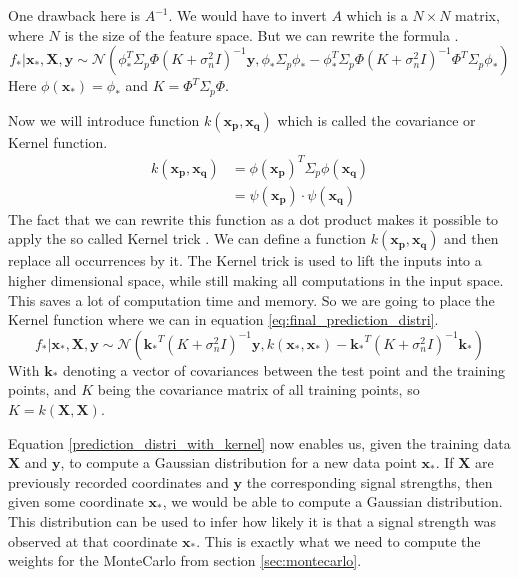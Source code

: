 One drawback here is $A^{-1}$. We would have to invert $A$ which is a $N\times N$ matrix, where $N$ is the size of the feature space. But we can rewrite the formula \citep[p.\ 12]{Rasmussen:2005:GPM:1162254}. 
\begin{equation}\label{eq:final_prediction_distri}
f_*|\mathbf{x_*},\mathbf{X}, \mathbf{y} \sim \mathcal{N}(\phi_*^T\Sigma_p\Phi(K+\sigma_n^2I)^{-1}\mathbf{y}, \phi_*\Sigma_p\phi_*-\phi_*^T\Sigma_p\Phi(K+\sigma_n^2I)^{-1}\Phi^T\Sigma_p\phi_*)
\end{equation}
Here $\phi(\mathbf{x_*}) = \phi_*$ and $K = \Phi^T\Sigma_p\Phi$.

Now we will introduce function $k(\mathbf{x_p}, \mathbf{x_q})$ which is called the covariance or \gls{Kernel} function. 
\begin{equation}\label{kernel}
\begin{aligned}
k(\mathbf{x_p}, \mathbf{x_q}) &= \phi(\mathbf{x_p})^T\Sigma_p\phi(\mathbf{x_q})\\
&= \psi(\mathbf{x_p}) \cdot \psi(\mathbf{x_q})
\end{aligned}
\end{equation}
The fact that we can rewrite this function as a dot product makes it possible to apply the so called \gls{Kernel} trick \citep[p.\ 12]{Rasmussen:2005:GPM:1162254}. We can define a function $k(\mathbf{x_p},\mathbf{x_q})$ and then replace all occurrences by it. The \gls{Kernel} trick is used to lift the inputs into a higher dimensional space, while still making all computations in the input space. This saves a lot of computation time and memory. So we are going to place the \gls{Kernel} function where we can in equation \ref{eq:final_prediction_distri}.
\begin{equation}\label{prediction_distri_with_kernel}
f_*|\mathbf{x_*},\mathbf{X}, \mathbf{y} \sim \mathcal{N}(\mathbf{k_*}^T(K+\sigma_n^2I)^{-1}\mathbf{y}, k(\mathbf{x_*},\mathbf{x_*})-\mathbf{k_*}^T(K+\sigma_n^2I)^{-1}\mathbf{k_*})
\end{equation}
With $\mathbf{k_*}$ denoting a vector of covariances between the test point and the training points, and $K$ being the covariance matrix of all training points, so $K = k(\mathbf{X}, \mathbf{X})$.

Equation \ref{prediction_distri_with_kernel} now enables us, given the training data $\mathbf{X}$ and $\mathbf{y}$, to compute a Gaussian distribution for a new data point $\mathbf{x_*}$. If $\mathbf{X}$ are previously recorded coordinates and $\mathbf{y}$ the corresponding signal strengths, then given some coordinate $\mathbf{x_*}$, we would be able to compute a Gaussian distribution. This distribution can be used to infer how likely it is that a signal strength was observed at that coordinate $\mathbf{x_*}$. This is exactly what we need to compute the weights for the \Gls{MonteCarlo} from section \ref{sec:montecarlo}.

